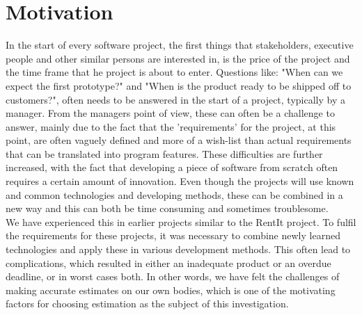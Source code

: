 \section{Motivation}
In the start of every software project, the first things that stakeholders, executive people and other similar persons are interested in, is the price of the project and the time frame that he project is about to enter. Questions like: "When can we expect the first prototype?" and "When is the product ready to be shipped off to customers?", often needs to be answered in the start of a project, typically by a manager. From the managers point of view, these can often be a challenge to answer, mainly due to the fact that the 'requirements' for the project, at this point, are often vaguely defined and more of a wish-list than actual requirements that can be translated into program features. These difficulties are further increased, with the fact that developing a piece of software from scratch often requires a certain amount of innovation\cite[p.139]{ProjectManagement_b}. Even though the projects will use known and common technologies and developing methods, these can be combined in a new way and this can both be time consuming and sometimes troublesome.\\ We have experienced this in earlier projects similar to the RentIt project. To fulfil the requirements for these projects, it was necessary to combine newly learned technologies and apply these in various development methods. This often lead to  complications, which resulted in either an inadequate product or an overdue deadline, or in worst cases both. In other words, we have felt the challenges of making accurate estimates on our own bodies, which is one of the motivating factors for choosing estimation as the subject of this investigation.\\


